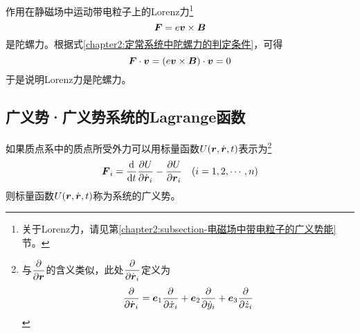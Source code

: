 \begin{example}
作用在静磁场中运动带电粒子上的Lorenz力\footnote{关于Lorenz力，请见第\ref{chapter2:subsection-电磁场中带电粒子的广义势能}节。}
\begin{equation*}
	\boldsymbol{F} = e\boldsymbol{v}\times \boldsymbol{B}
\end{equation*}
是陀螺力。根据式\eqref{chapter2:定常系统中陀螺力的判定条件}，可得
\begin{equation*}
	\boldsymbol{F} \cdot \boldsymbol{v} = (e\boldsymbol{v}\times \boldsymbol{B})\cdot \boldsymbol{v} = 0
\end{equation*}
于是说明Lorenz力是陀螺力。
\end{example}

\subsection{广义势·广义势系统的Lagrange函数}

如果质点系中的质点所受外力可以用标量函数$U(\boldsymbol{r},\dot{\boldsymbol{r}},t)$表示为\footnote{与$\dfrac{\partial}{\partial \boldsymbol{r}}$的含义类似，此处$\dfrac{\partial}{\partial \dot{\boldsymbol{r}}_i}$定义为\begin{equation*} \frac{\partial}{\partial \dot{\boldsymbol{r}}_i} = \boldsymbol{e}_1 \frac{\partial}{\partial \dot{x}_i} + \boldsymbol{e}_2 \frac{\partial}{\partial \dot{y}_i} + \boldsymbol{e}_3 \frac{\partial}{\partial \dot{z}_i} \end{equation*}}
\begin{equation}
	\boldsymbol{F}_i = \frac{\mathrm{d}}{\mathrm{d} t} \frac{\partial U}{\partial \dot{\boldsymbol{r}}_i} - \frac{\partial U}{\partial \boldsymbol{r}_i}\quad (i = 1,2,\cdots,n)
	\label{广义势关系}
\end{equation}
则标量函数$U(\boldsymbol{r},\dot{\boldsymbol{r}},t)$称为系统的{\heiti 广义势}。

